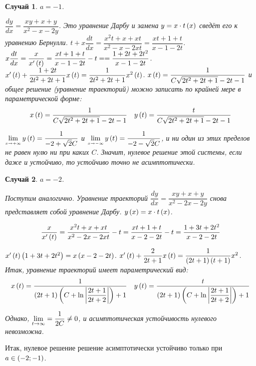 \documentclass[a5paper,10pt]{article}
\begin{document}
\newtheorem{case*}{Случай}
\begin{case*} $a = -1$.

$\dfrac {dy} {dx} = \dfrac {xy + x + y} {x^2 - x - 2y}$. Это уравнение Дарбу и замена $y = x \cdot t\left(x\right)$ сведёт его к уравнению Бернулли.
$t + x \dfrac {dt} {dx} = \dfrac {x^2t + x + xt} {x^2 - x - 2xt} = \dfrac {xt + 1 + t} {x - 1 - 2t}$.
$x \dfrac {dt} {dx} = \dfrac {x} {x'\br{t}} = \dfrac {xt + 1 + t} {x - 1 - 2t} - t = \linebreak = \dfrac {1 + 2t + 2t^2} {x - 1 - 2t}$.
$x'\left(t\right) + \dfrac {1 + 2t} {2t^2 + 2t + 1} x\left(t\right) = \dfrac {1} {2t^2 + 2t + 1} x^2\left(t\right)$. $x\left(t\right) = \dfrac {1} {C \sqrt{2t^2 + 2t + 1} - 2t - 1}$ и общее решение (уравнение траекторий) можно записать по крайней мере в параметрической форме:
\begin{align*}
x\left(t\right) = \dfrac {1} {C \sqrt{2t^2 + 2t + 1} - 2t - 1} && y\left(t\right) = \dfrac {t} {C \sqrt{2t^2 + 2t + 1} - 2t - 1}
\end{align*}

$\tlim{\mathsmaller{x \to +\infty}} y\br{t} = \dfrac {1} {-2 + \sqrt{2} C}$ и $\tlim{\mathsmaller{x \to -\infty}} y\br{t} = \dfrac {1} {-2 - \sqrt{2} C}$, и ни один из этих пределов не равен нулю ни при каких $C$. Значит, нулевое решение этой системы, если даже и устойчиво, то устойчиво точно не асимптотически.

\end{case*}

\begin{case*}$a = -2$.

Поступим аналогично. Уравнение траекторий $\dfrac {dy} {dx} = \dfrac {xy + x + y} {x^2 - 2x - 2y}$ снова представляет собой уравнение Дарбу. $y\left(x\right) = x \cdot t\left(x\right)$.

$$
\dfrac {x} {x'\left(t\right)} 
= \dfrac {x^2 t + x + xt} {x^2 - 2x - 2xt} - t 
= \dfrac {xt + 1 + t} {x - 2 - 2t} - t
= \dfrac {1 + 3t + 2t^2} {x - 2 - 2t}
$$

$x'\left(t\right) \left(1 + 3t + 2t^2\right) = x \left(x - 2 - 2t\right)$.
$x'\left(t\right) + \dfrac {2} {2t + 1} x\left(t\right) = \dfrac {1} {\left(2t + 1\right)\left(t + 1\right)} x^2$.
Итак, уравнение траекторий имеет параметрический вид:
\begin{align*}
x\left(t\right) = \frac {1} {\left(2t + 1\right) \left(C + \ln\left|\dfrac {2t + 1} {2t + 2}\right|\right) + 1}
&& y\left(t\right) = \frac {t} {\left(2t + 1\right) \left(C + \ln\left|\dfrac {2t + 1} {2t + 2}\right|\right) + 1}
\end{align*}

Однако, $\lim\limits_{t \to \infty} = \dfrac {1} {2C} \ne 0$, и асимптотическая устойчивость нулевого невозможна.
\end{case*}

Итак, нулевое решение решение асимптотически устойчиво только при $a \in \left(-2; -1\right)$.
\end{document}
